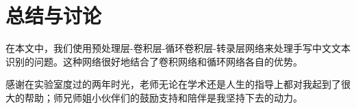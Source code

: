 \documentclass[winfonts]{njuthesis}
\begin{document}

\mainmatter





\chapter{总结与讨论}
在本文中，我们使用预处理层-卷积层-循环卷积层-转录层网络来处理手写中文文本识别的问题。这种网络很好地结合了卷积网络和循环网络各自的优势。



\begin{acknowledgement}
感谢在实验室度过的两年时光，老师无论在学术还是人生的指导上都对我起到了很大的帮助；师兄师姐小伙伴们的鼓励支持和陪伴是我坚持下去的动力。
\end{acknowledgement}

\end{document}
